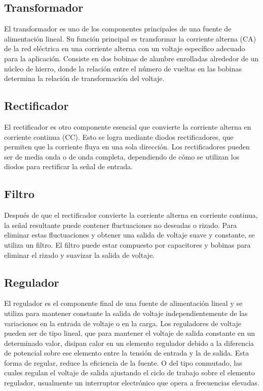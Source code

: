 \subsection{Transformador}\par 
El transformador es uno de los componentes principales de una fuente de alimentación lineal. Su función principal es transformar la corriente alterna (CA) de la red eléctrica en una corriente alterna con un voltaje específico adecuado para la aplicación. Consiste en dos bobinas de alambre enrolladas alrededor de un núcleo de hierro, donde la relación entre el número de vueltas en las bobinas determina la relación de transformación del voltaje.

\subsection{Rectificador}\par 
El rectificador es otro componente esencial que convierte la corriente alterna en corriente continua (CC). Esto se logra mediante diodos rectificadores, que permiten que la corriente fluya en una sola dirección. Los rectificadores pueden ser de media onda o de onda completa, dependiendo de cómo se utilizan los diodos para rectificar la señal de entrada.

\subsection{Filtro}\par 
Después de que el rectificador convierte la corriente alterna en corriente continua, la señal resultante puede contener fluctuaciones no deseadas o rizado. Para eliminar estas fluctuaciones y obtener una salida de voltaje suave y constante, se utiliza un filtro. El filtro puede estar compuesto por capacitores y bobinas para eliminar el rizado y suavizar la salida de voltaje.

\subsection{Regulador}\par 
El regulador es el componente final de una fuente de alimentación lineal y se utiliza para mantener constante la salida de voltaje independientemente de las variaciones en la entrada de voltaje o en la carga. Los reguladores de voltaje pueden ser de tipo lineal, que para mantener el voltaje de salida constante en un determinado valor, disipan calor en un elemento regulador debido a la diferencia de potencial sobre ese elemento entre la tensión de entrada y la de salida. Esta forma de regular, reduce la eficiencia de la fuente. O del tipo conmutado, las cuales regulan el voltaje de salida ajustando el ciclo de trabajo sobre el elemento regulador, usualmente un interruptor electrónico que opera a frecuencias elevadas. \par 

